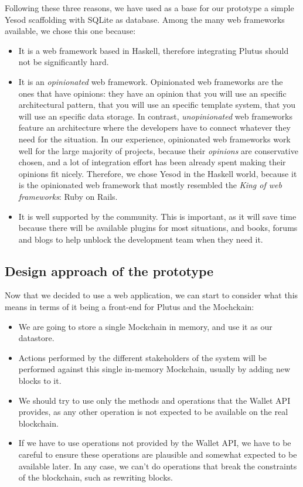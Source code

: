 \documentclass{article}
\begin{document}
Following these three reasons, we have used as a base for our prototype a simple Yesod scaffolding with SQLite as database. Among the many web frameworks available, we chose this one because:

\begin{itemize}
  \item It is a web framework based in Haskell, therefore integrating Plutus should not be significantly hard.
  \item It is an \emph{opinionated} web framework. Opinionated web frameworks are the ones that have opinions: they have an opinion that you will use an specific architectural pattern, that you will use an specific template system, that you will use an specific data storage. In contrast, \emph{unopinionated} web frameworks feature an architecture where the developers have to connect whatever they need for the situation. In our experience, opinionated web frameworks work well for the large majority of projects, because their \emph{opinions} are conservative chosen, and a lot of integration effort has been already spent making their opinions fit nicely. Therefore, we chose Yesod in the Haskell world, because it is the opinionated web framework that mostly resembled the \emph{King of web frameworks}: Ruby on Rails.
  \item It is well supported by the community. This is important, as it will save time because there will be available plugins for most situations, and books, forums and blogs to help unblock the development team when they need it.
\end{itemize}

\subsection{Design approach of the prototype}
Now that we decided to use a web application, we can start to consider what this means in terms of it being a front-end for Plutus and the Mochckain:

\begin{itemize}
  \item We are going to store a single Mockchain in memory, and use it as our datastore.
  \item Actions performed by the different stakeholders of the system will be performed against this single in-memory Mockchain, usually by adding new blocks to it.
  \item We should try to use only the methods and operations that the Wallet API provides, as any other operation is not expected to be available on the real blockchain.
  \item If we have to use operations not provided by the Wallet API, we have to be careful to ensure these operations are plausible and somewhat expected to be available later. In any case, we can't do operations that break the constraints of the blockchain, such as rewriting blocks.
\end{itemize}
\end{document}
